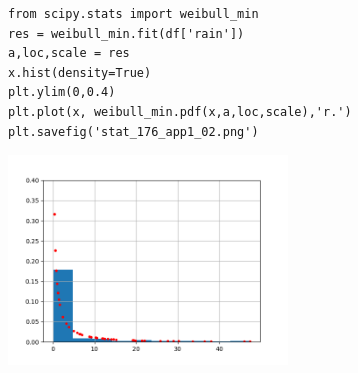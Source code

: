 \documentclass[12pt,fleqn]{article}\usepackage{../../common}
\begin{document}
\begin{verbatim}
from scipy.stats import weibull_min
res = weibull_min.fit(df['rain'])
a,loc,scale = res  
x.hist(density=True)
plt.ylim(0,0.4)
plt.plot(x, weibull_min.pdf(x,a,loc,scale),'r.')
plt.savefig('stat_176_app1_02.png')
\end{verbatim}

\includegraphics[width=20em]{stat_176_app1_02.png}
\end{document}
